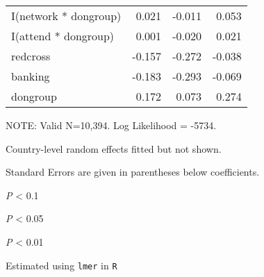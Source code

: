 \begin{table}
\begin{threeparttable}
\begin{tabularx}{4.25in}{X*{3}{d}}
I(network * dongroup) & 0.021 & -0.011 & 0.053 \\ 
I(attend * dongroup) & 0.001 & -0.020 & 0.021 \\ 
redcross & -0.157 & -0.272 & -0.038 \\ 
banking & -0.183 & -0.293 & -0.069 \\ 
dongroup & 0.172 & 0.073 & 0.274 \\ 
\bottomrule
\end{tabularx}
\begin{tablenotes}
\item \scriptsize{NOTE: Valid N=10,394. Log Likelihood = -5734.}
\item \scriptsize{Country-level random effects fitted but not shown.}
\item \scriptsize{Standard Errors are given in parentheses below coefficients.}
\item \scriptsize{\sym{*} \emph{P} < 0.1}
\item \scriptsize{\sym{**} \emph{P} < 0.05}
\item \scriptsize{\sym{***} \emph{P} < 0.01}
\item \scriptsize{Estimated using \texttt{lmer} in \texttt{R}}
\end{tablenotes}
\end{threeparttable}
\fontsize{10}{15}\selectfont
\end{table}